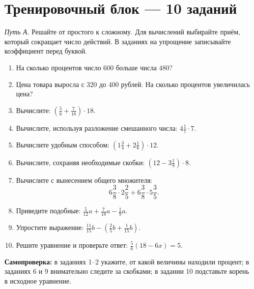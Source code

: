 \documentclass[a4paper,12pt]{article}
\newcommand{\sect}[1]{\Needspace{8\baselineskip}\section*{\color{darkaccent}#1}\vspace{-2mm}\noindent{\color{softline}\rule{\linewidth}{0.5pt}}\vspace{1mm}}
\begin{document}
\sect{Тренировочный блок --- 10 заданий}
\textit{Путь А.} Решайте от простого к сложному. Для вычислений выбирайте приём, который сокращает число действий. В заданиях на упрощение записывайте коэффициент перед буквой.
\begin{enumerate}[label=\textbf{\arabic*.},itemsep=5pt]
\item На сколько процентов число 600 больше числа 480?
\item Цена товара выросла с 320 до 400 рублей. На сколько процентов увеличилась цена?
\item Вычислите: \(\displaystyle\left(\frac56+\frac7{18}\right)\cdot18\).
\item Вычислите, используя разложение смешанного числа: \(\displaystyle4\frac17\cdot7\).
\item Вычислите удобным способом: \(\displaystyle\left(1\frac34+2\frac16\right)\cdot12\).
\item Вычислите, сохраняя необходимые скобки: \(\displaystyle\left(12-3\frac18\right)\cdot8\).
\item Вычислите с вынесением общего множителя:
\[
6\frac38\cdot2\frac25+6\frac38\cdot5\frac35.
\]
\item Приведите подобные: \(\displaystyle\frac5{12}a+\frac7{18}a-\frac19a\).
\item Упростите выражение: \(\displaystyle\frac{11}{15}b-\left(\frac25b+\frac1{15}b\right)\).
\item Решите уравнение и проверьте ответ: \(\displaystyle\frac56(18-6x)=5\).
\end{enumerate}
\vfill
{\color{darkaccent}\small\textbf{Самопроверка:} в заданиях 1--2 укажите, от какой величины находили процент; в заданиях 6 и 9 внимательно следите за скобками; в задании 10 подставьте корень в исходное уравнение.}
\clearpage
\end{document}
